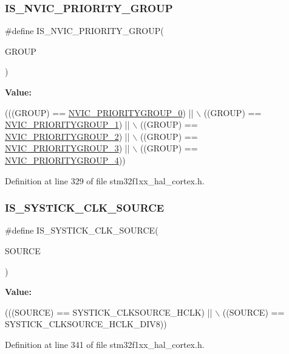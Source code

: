 \subsubsection{\texorpdfstring{I\+S\+\_\+\+N\+V\+I\+C\+\_\+\+P\+R\+I\+O\+R\+I\+T\+Y\+\_\+\+G\+R\+O\+UP}{IS\_NVIC\_PRIORITY\_GROUP}}
{\footnotesize\ttfamily \#define I\+S\+\_\+\+N\+V\+I\+C\+\_\+\+P\+R\+I\+O\+R\+I\+T\+Y\+\_\+\+G\+R\+O\+UP(\begin{DoxyParamCaption}\item[{}]{G\+R\+O\+UP }\end{DoxyParamCaption})}

{\bfseries Value\+:}
\begin{DoxyCode}
(((GROUP) == \hyperlink{group___c_o_r_t_e_x___preemption___priority___group_ga5e97dcff77680602c86e44f23f5ffa1a}{NVIC\_PRIORITYGROUP\_0}) || \(\backslash\)
                                       ((GROUP) == \hyperlink{group___c_o_r_t_e_x___preemption___priority___group_ga702227137b010421c3a3b6434005a132}{NVIC\_PRIORITYGROUP\_1}) || \(\backslash\)
                                       ((GROUP) == \hyperlink{group___c_o_r_t_e_x___preemption___priority___group_gaa43a3fd37850c120ce567ab2743d11b4}{NVIC\_PRIORITYGROUP\_2}) || \(\backslash\)
                                       ((GROUP) == \hyperlink{group___c_o_r_t_e_x___preemption___priority___group_ga8ddb24962e6f0fc3273139d45d374b09}{NVIC\_PRIORITYGROUP\_3}) || \(\backslash\)
                                       ((GROUP) == \hyperlink{group___c_o_r_t_e_x___preemption___priority___group_gae6eab9140204bc938255aa148e597c45}{NVIC\_PRIORITYGROUP\_4}))
\end{DoxyCode}


Definition at line 329 of file stm32f1xx\+\_\+hal\+\_\+cortex.\+h.

\mbox{\label{group___c_o_r_t_e_x___private___macros_ga22d6291f6aed29442cf4cd9098fa0784}} 
\subsubsection{\texorpdfstring{I\+S\+\_\+\+S\+Y\+S\+T\+I\+C\+K\+\_\+\+C\+L\+K\+\_\+\+S\+O\+U\+R\+CE}{IS\_SYSTICK\_CLK\_SOURCE}}
{\footnotesize\ttfamily \#define I\+S\+\_\+\+S\+Y\+S\+T\+I\+C\+K\+\_\+\+C\+L\+K\+\_\+\+S\+O\+U\+R\+CE(\begin{DoxyParamCaption}\item[{}]{S\+O\+U\+R\+CE }\end{DoxyParamCaption})}

{\bfseries Value\+:}
\begin{DoxyCode}
(((SOURCE) == SYSTICK\_CLKSOURCE\_HCLK) || \(\backslash\)
                                       ((SOURCE) == SYSTICK\_CLKSOURCE\_HCLK\_DIV8))
\end{DoxyCode}


Definition at line 341 of file stm32f1xx\+\_\+hal\+\_\+cortex.\+h.

